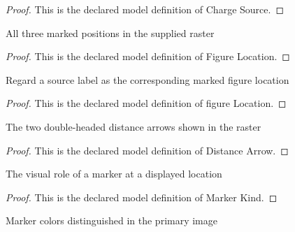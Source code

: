 \begin{proof}
  This is the declared model definition of Charge Source.
\end{proof}
\begin{definition}
  \label{def:physics:phyx-mini-0915:phyxminiproblems-problemphyxmini0915-figurelocation}
  All three marked positions in the supplied raster
\end{definition}
\begin{proof}
  This is the declared model definition of Figure Location.
\end{proof}
\begin{definition}
  \label{def:physics:phyx-mini-0915:phyxminiproblems-problemphyxmini0915-chargesource-figurelocation}
  Regard a source label as the corresponding marked figure location
\end{definition}
\begin{proof}
  This is the declared model definition of figure Location.
\end{proof}
\begin{definition}
  \label{def:physics:phyx-mini-0915:phyxminiproblems-problemphyxmini0915-distancearrow}
  The two double-headed distance arrows shown in the raster
\end{definition}
\begin{proof}
  This is the declared model definition of Distance Arrow.
\end{proof}
\begin{definition}
  \label{def:physics:phyx-mini-0915:phyxminiproblems-problemphyxmini0915-markerkind}
  The visual role of a marker at a displayed location
\end{definition}
\begin{proof}
  This is the declared model definition of Marker Kind.
\end{proof}
\begin{definition}
  \label{def:physics:phyx-mini-0915:phyxminiproblems-problemphyxmini0915-markercolor}
  Marker colors distinguished in the primary image
\end{definition}
